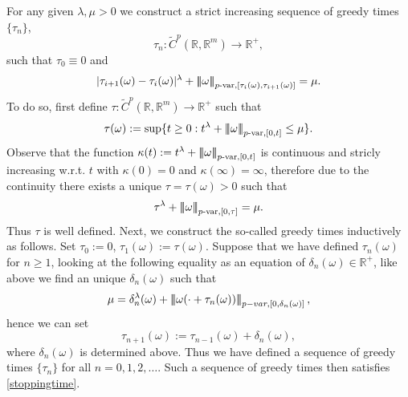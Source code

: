 \documentclass[10pt]{article}
\numberwithin{equation}{section} %
\newcommand{\R}{\ensuremath{\mathbb{R}}}
\newcommand{\ltn}{\ensuremath{\left| \! \left| \! \left|}}
\newcommand{\rtn}{\ensuremath{\right| \! \right| \! \right|}}
\begin{document}
For  any given $\lambda,\mu>0$ we construct a strict increasing sequence of greedy times $\{\tau_n\}$, 
$$
\tau_n:\widetilde{C}^{p}(\R,\R^m)\longrightarrow\R^+,
$$  
such that $\tau_0\equiv 0$ and 
\begin{equation}\label{stoppingtime}
|\tau_{i+1}(\omega)-\tau_i(\omega)|^\lambda+\ltn\omega\rtn_{p\text{-var},[\tau_i(\omega),\tau_{i+1}(\omega)]} = \mu.
\end{equation}
To do so, first define $\tau: \widetilde{C}^{p}(\R,\R^m)\longrightarrow\R^+$ such that
\[
\tau (\omega) := \sup \{t\geq 0: t^\lambda + \ltn \omega \rtn_{p\text{-var},[0,t]} \leq \mu\}.
\]  
Observe that the function $\kappa(t):= t^\lambda + \ltn \omega \rtn_{p\text{-var},[0,t]}$ is continuous and stricly increasing w.r.t. $t$ with $\kappa (0) =0$ and $\kappa(\infty) = \infty$, therefore due to the continuity there exists a unique $\tau= \tau(\omega)>0$ such that
\begin{equation}\label{stoptime1}
\tau^\lambda + \ltn \omega \rtn_{p\text{-var},[0,\tau]} = \mu.
\end{equation}
Thus $\tau$ is well defined. Next, we construct the so-called greedy times inductively as follows. 
Set $\tau_0 := 0$, $\tau_1 (\omega) := \tau(\omega) $. Suppose that we have defined $\tau_n (\omega)$ for $n\geq 1$, looking at the following equality as an equation of $\delta_n(\omega)\in \R^+$,  like above we find an unique $\delta_n(\omega)$
 such that
$$
\mu = \delta_n^\lambda(\omega) + \ltn \omega(\cdot + \tau_n(\omega))\rtn_{p-var,[0,\delta_n(\omega)]},
$$
hence we can set
\begin{equation}\label{stoptime2}
\tau_{n+1}(\omega) := \tau_{n-1}(\omega) + \delta_n(\omega), 
\end{equation}
where $\delta_n(\omega)$ is determined above. Thus we have defined a sequence of greedy times $\{\tau_n\}$ for all $n=0,1,2,\ldots$.
Such a sequence of greedy times then satisfies \eqref{stoppingtime}.%
\medskip
\end{document}
